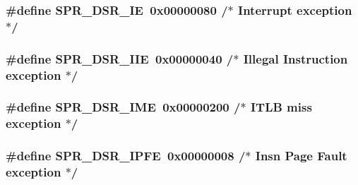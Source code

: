 \hypertarget{spr-defs_8h_a1db95da7cbadd7e24dacdb2f0142d49a}{
\subsubsection[{\-S\-P\-R\-\_\-\-D\-S\-R\-\_\-\-I\-E}]{\setlength{\rightskip}{0pt plus 5cm}\#define {\bf \-S\-P\-R\-\_\-\-D\-S\-R\-\_\-\-I\-E}~0x00000080  /$\ast$ Interrupt exception $\ast$/}}\label{spr-defs_8h_a1db95da7cbadd7e24dacdb2f0142d49a}
\hypertarget{spr-defs_8h_a591bb2979c61c4171cf4df88b0056dfc}{
\subsubsection[{\-S\-P\-R\-\_\-\-D\-S\-R\-\_\-\-I\-I\-E}]{\setlength{\rightskip}{0pt plus 5cm}\#define {\bf \-S\-P\-R\-\_\-\-D\-S\-R\-\_\-\-I\-I\-E}~0x00000040  /$\ast$ Illegal Instruction exception $\ast$/}}\label{spr-defs_8h_a591bb2979c61c4171cf4df88b0056dfc}
\hypertarget{spr-defs_8h_a5d05dd89316e2e2c74ba4563bab89268}{
\subsubsection[{\-S\-P\-R\-\_\-\-D\-S\-R\-\_\-\-I\-M\-E}]{\setlength{\rightskip}{0pt plus 5cm}\#define {\bf \-S\-P\-R\-\_\-\-D\-S\-R\-\_\-\-I\-M\-E}~0x00000200  /$\ast$ I\-T\-L\-B miss exception $\ast$/}}\label{spr-defs_8h_a5d05dd89316e2e2c74ba4563bab89268}
\hypertarget{spr-defs_8h_a34b653dafe7834cfa3ae0ca2f8326e64}{
\subsubsection[{\-S\-P\-R\-\_\-\-D\-S\-R\-\_\-\-I\-P\-F\-E}]{\setlength{\rightskip}{0pt plus 5cm}\#define {\bf \-S\-P\-R\-\_\-\-D\-S\-R\-\_\-\-I\-P\-F\-E}~0x00000008  /$\ast$ Insn Page Fault exception $\ast$/}}\label{spr-defs_8h_a34b653dafe7834cfa3ae0ca2f8326e64}
